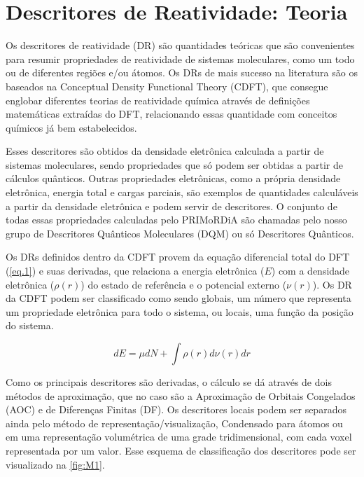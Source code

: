 \documentclass[a4paper,11pt]{refart}
\begin{document}
\newpage
\section{Descritores de Reatividade: Teoria}

Os descritores de reatividade (DR) são quantidades teóricas que são convenientes para resumir propriedades de reatividade de sistemas moleculares, como um todo ou de diferentes regiões e/ou átomos. Os DRs de mais sucesso na literatura são os baseados na Conceptual Density Functional Theory (CDFT), que consegue englobar diferentes teorias de reatividade química através de definições matemáticas extraídas do DFT, relacionando essas quantidade com conceitos químicos já bem estabelecidos\cite{geerlings2003conceptual}. 

Esses descritores são obtidos da densidade eletrônica calculada a partir de sistemas moleculares, sendo propriedades que só podem ser obtidas a partir de cálculos quânticos. Outras propriedades eletrônicas, como a própria densidade eletrônica, energia total e cargas parciais, são exemplos de quantidades calculáveis a partir da densidade eletrônica e podem servir de descritores. O conjunto de todas essas propriedades calculadas pelo PRIMoRDiA são chamadas pelo nosso grupo de Descritores Quânticos Moleculares (DQM) ou só Descritores Quânticos.

Os DRs definidos dentro da CDFT provem da equação diferencial total do DFT (\autoref{eq.1}) e suas derivadas\cite{parr1978elect}, que relaciona a energia eletrônica ($E$) com a densidade eletrônica ($\rho(r)$) do estado de referência e o potencial externo ($\nu(r)$). Os DR da CDFT podem ser classificado como sendo globais, um número que representa um propriedade eletrônica para todo o sistema, ou locais, uma função da posição do sistema. 

\begin{equation}
dE = \mu dN + \int \rho(r) d \nu (r) dr
\label{eq.1}
\end{equation}

Como os principais descritores são derivadas, o cálculo se dá através de dois métodos de aproximação, que no caso são a Aproximação de Orbitais Congelados (AOC) e de Diferenças Finitas (DF). Os descritores locais podem ser separados ainda pelo método de representação/visualização, Condensado para átomos ou em uma representação volumétrica de uma grade tridimensional, com cada voxel representada por um valor. Esse esquema de classificação dos descritores pode ser visualizado na \autoref{fig:M1}.
\end{document}
